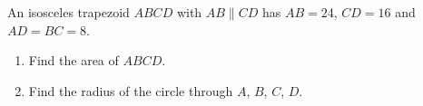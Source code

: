 An isosceles trapezoid $ABCD$ with $AB\parallel CD$ has $AB=24$, $CD=16$ and $AD=BC=8$.
\begin{enumerate}
\item[(a)] Find the area of $ABCD$.
\item[(b)] Find the radius of the circle through $A$, $B$, $C$, $D$.
\end{enumerate}
